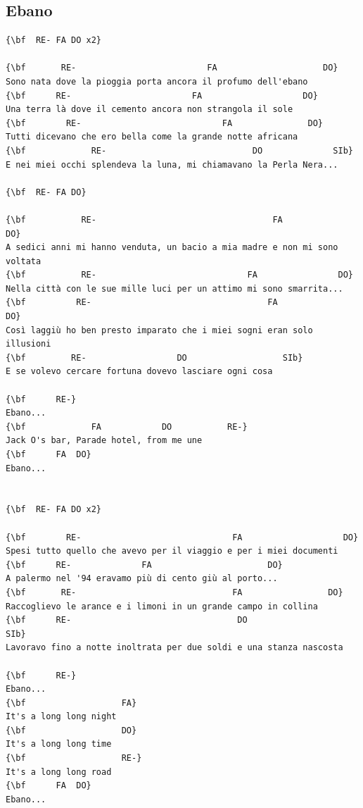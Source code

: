 \documentclass[a4paper]{article}
\begin{document}
\subsection{Ebano}
\begin{Verbatim}[commandchars=\\\{\}]
{\bf  RE- FA DO x2}

{\bf       RE-                          FA                     DO}
Sono nata dove la pioggia porta ancora il profumo dell'ebano
{\bf      RE-                        FA                    DO}
Una terra là dove il cemento ancora non strangola il sole
{\bf        RE-                            FA               DO}
Tutti dicevano che ero bella come la grande notte africana
{\bf             RE-                             DO              SIb}
E nei miei occhi splendeva la luna, mi chiamavano la Perla Nera...

{\bf  RE- FA DO}

{\bf           RE-                                   FA                     DO}
A sedici anni mi hanno venduta, un bacio a mia madre e non mi sono voltata
{\bf           RE-                              FA                DO}
Nella città con le sue mille luci per un attimo mi sono smarrita...
{\bf          RE-                                   FA                  DO}
Così laggiù ho ben presto imparato che i miei sogni eran solo illusioni
{\bf         RE-                  DO                   SIb}
E se volevo cercare fortuna dovevo lasciare ogni cosa

{\bf      RE-}
Ebano...
{\bf             FA            DO           RE-}
Jack O's bar, Parade hotel, from me une
{\bf      FA  DO}
Ebano...


{\bf  RE- FA DO x2}

{\bf        RE-                              FA                    DO}
Spesi tutto quello che avevo per il viaggio e per i miei documenti
{\bf      RE-              FA                       DO}
A palermo nel '94 eravamo più di cento giù al porto...
{\bf       RE-                               FA                 DO}
Raccoglievo le arance e i limoni in un grande campo in collina
{\bf      RE-                                 DO                    SIb}
Lavoravo fino a notte inoltrata per due soldi e una stanza nascosta

{\bf      RE-}
Ebano...
{\bf                   FA}
It's a long long night
{\bf                   DO}
It's a long long time
{\bf                   RE-}
It's a long long road
{\bf      FA  DO}
Ebano...


\end{Verbatim}
\end{document}

